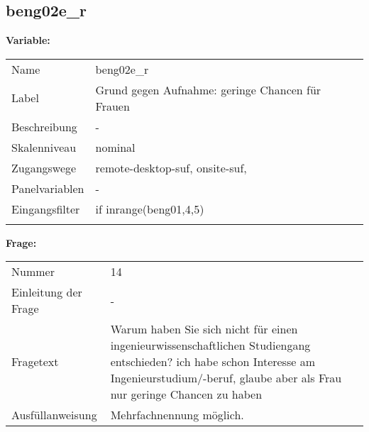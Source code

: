 	
	
	\subsection{beng02e\_r}
	\label{subSection:beng02e_r}

	\noindent\textbf{Variable:}\\
		\begin{tabular}{lL{11.3cm}}
			\label{tableVariable:beng02e_r}
			Name & beng02e\_r \\
			Label & Grund gegen Aufnahme: geringe Chancen für Frauen \\
			Beschreibung & - \\
			Skalenniveau & nominal \\
			Zugangswege &
				remote-desktop-suf,
				onsite-suf,
 \\
			Panelvariablen & -
			 \\
			Eingangsfilter & if inrange(beng01,4,5) \\
 \\
		\end{tabular}

		\vspace*{1 cm}
		\noindent\textbf{Frage:}\\
		\begin{tabular}{lL{11.3cm}}
			\label{tableQuestion:beng02e_r}
			Nummer & 14 \\
			Einleitung der Frage & - \\
			Fragetext & Warum haben Sie sich nicht für einen ingenieurwissenschaftlichen Studiengang entschieden?
ich habe schon Interesse am Ingenieurstudium/-beruf, glaube aber als Frau nur geringe Chancen zu haben \\
			Ausfüllanweisung & Mehrfachnennung möglich. \\
		\end{tabular}





